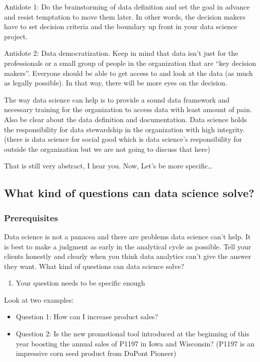 \documentclass[12pt,]{krantz}
\providecommand{\tightlist}{%
  \setlength{\itemsep}{0pt}\setlength{\parskip}{0pt}}
\theoremstyle{definition}
\theoremstyle{definition}
\theoremstyle{definition}
\theoremstyle{remark}
\begin{document}
Antidote 1: Do the brainstorming of data definition and set the goal in
advance and resist temptation to move them later. In other words, the
decision makers have to set decision criteria and the boundary up front
in your data science project.

Antidote 2: Data democratization. Keep in mind that data isn't just for
the professionals or a small group of people in the organization that
are ``key decision makers''. Everyone should be able to get access to
and look at the data (as much as legally possible). In that way, there
will be more eyes on the decision.

The way data science can help is to provide a sound data framework and
necessary training for the organization to access data with least amount
of pain. Also be clear about the data definition and documentation. Data
science holds the responsibility for data stewardship in the
organization with high integrity. (there is data science for social good
which is data science's responsibility for outside the organization but
we are not going to discuss that here)

That is still very abstract, I hear you. Now, Let's be more
specific\ldots{}

\subsection{What kind of questions can data science
solve?}\label{what-kind-of-questions-can-data-science-solve}

\subsubsection{Prerequisites}\label{prerequisites}

Data science is not a panacea and there are problems data science can't
help. It is best to make a judgment as early in the analytical cycle as
possible. Tell your clients honestly and clearly when you think data
analytics can't give the answer they want. What kind of questions can
data science solve?

\begin{enumerate}
\def\labelenumi{\arabic{enumi}.}
\tightlist
\item
  Your question needs to be specific enough
\end{enumerate}

Look at two examples:

\begin{itemize}
\tightlist
\item
  Question 1: How can I increase product sales?
\item
  Question 2: Is the new promotional tool introduced at the beginning of
  this year boosting the annual sales of P1197 in Iowa and Wisconsin?
  (P1197 is an impressive corn seed product from DuPont Pioneer)
\end{itemize}
\end{document}
